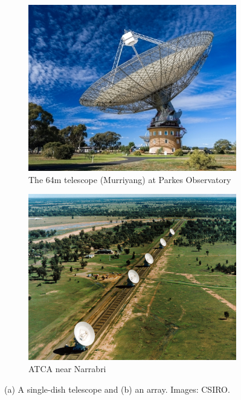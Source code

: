         \begin{figure}
            \centering
            \begin{subfigure}{0.45\textwidth}
                \includegraphics[width=\textwidth]{images/CSIRO-Parkes-Wiradjuri-naming-Murriyang.jpg}
                \caption{The 64m telescope (Murriyang) at Parkes Observatory}
                \label{fig:murriyang}
            \end{subfigure}
            \begin{subfigure}{0.45\textwidth}
                \includegraphics[width=\textwidth]{images/atca.jpg}
                \caption{ATCA near Narrabri}
                \label{fig:atca}
            \end{subfigure}
            \caption[A single dish telescope and a radio array.]{\label{fig:telescopes} (a) A single-dish telescope and (b) an array. Images: CSIRO.}
        \end{figure}


